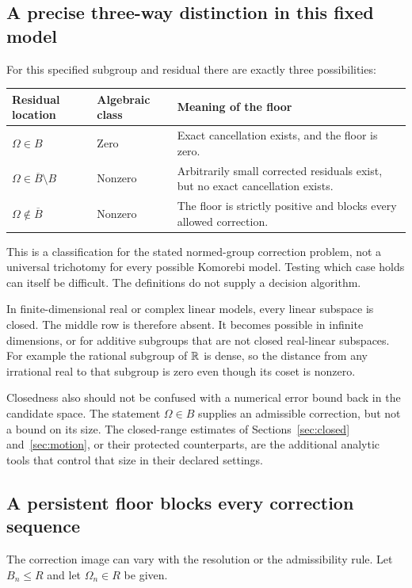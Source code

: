 \subsection{A precise three-way distinction in this fixed model}
For this specified subgroup and residual there are exactly three possibilities:
\begin{center}
\begin{tabularx}{\linewidth}{@{}p{.29\linewidth}p{.20\linewidth}X@{}}
\toprule Residual location & Algebraic class & Meaning of the floor\\\midrule
\(\Omega\in B\) & Zero & Exact cancellation exists, and the floor is zero.\\
\(\Omega\in\overline B\setminus B\) & Nonzero & Arbitrarily small corrected residuals exist, but no exact cancellation exists.\\
\(\Omega\notin\overline B\) & Nonzero & The floor is strictly positive and blocks every allowed correction.\\\bottomrule
\end{tabularx}
\end{center}
This is a classification for the stated normed-group correction problem, not a universal trichotomy for every possible Komorebi model. Testing which case holds can itself be difficult. The definitions do not supply a decision algorithm.

In finite-dimensional real or complex linear models, every linear subspace is closed. The middle row is therefore absent. It becomes possible in infinite dimensions, or for additive subgroups that are not closed real-linear subspaces. For example the rational subgroup of \(\mathbb R\) is dense, so the distance from any irrational real to that subgroup is zero even though its coset is nonzero.

Closedness also should not be confused with a numerical error bound back in the candidate space. The statement \(\Omega\in B\) supplies an admissible correction, but not a bound on its size. The closed-range estimates of Sections~\ref{sec:closed} and~\ref{sec:motion}, or their protected counterparts, are the additional analytic tools that control that size in their declared settings.

\subsection{A persistent floor blocks every correction sequence}
The correction image can vary with the resolution or the admissibility rule. Let \(B_n\le R\) and let \(\Omega_n\in R\) be given.

